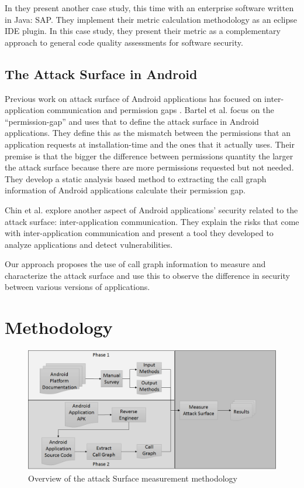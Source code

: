 \documentclass[conference]{IEEEtran}
\begin{document}
In \cite{manadhata2009report} they present another case study, this time with an enterprise software written in Java: SAP. They implement their metric calculation methodology as an eclipse IDE plugin. In this case study, they present their metric as a complementary approach to general code quality assessments for software security.

\subsection{The Attack Surface in Android}

Previous work on attack surface of Android applications has focused on inter-application communication \cite{chin_analyzing_2011} and permission gaps \cite{bartel_automatically_2012}. Bartel et al. \cite{bartel_automatically_2012} focus on the “permission-gap” and uses that to define the attack surface in Android applications. They define this as the mismatch between the permissions that an application requests at installation-time and the ones that it actually uses. Their premise is that the bigger the difference between permissions quantity the larger the attack surface because there are more permissions requested but not needed. They develop a static analysis based method to extracting the call graph information of Android applications calculate their permission gap.

Chin et al. \cite{chin_analyzing_2011} explore another aspect of Android applications' security related to the attack surface: inter-application communication. They explain the risks that come with inter-application communication and present a tool they developed to analyze applications and detect vulnerabilities.

Our approach proposes the use of call graph information to measure and characterize the attack surface and use this to observe the difference in security between various versions of applications.

\section{Methodology}

\begin{figure}
  \centering
  \includegraphics[scale=0.45]{figs/methodology.png}
  \caption{Overview of the attack Surface measurement methodology}
  \label{fig:methodology}
\end{figure}
\end{document}
